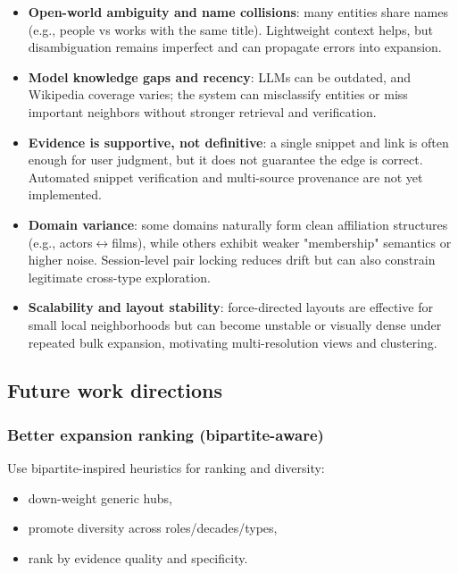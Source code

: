 \begin{itemize}[leftmargin=*]

\item \textbf{Open-world ambiguity and name collisions}: many entities share names (e.g., people vs works with the same title). Lightweight context helps, but disambiguation remains imperfect and can propagate errors into expansion.

\item \textbf{Model knowledge gaps and recency}: LLMs can be outdated, and Wikipedia coverage varies; the system can misclassify entities or miss important neighbors without stronger retrieval and verification.

\item \textbf{Evidence is supportive, not definitive}: a single snippet and link is often enough for user judgment, but it does not guarantee the edge is correct. Automated snippet verification and multi-source provenance are not yet implemented.

\item \textbf{Domain variance}: some domains naturally form clean affiliation structures (e.g., actors\(\leftrightarrow\)films), while others exhibit weaker "membership" semantics or higher noise. Session-level pair locking reduces drift but can also constrain legitimate cross-type exploration.

\item \textbf{Scalability and layout stability}: force-directed layouts are effective for small local neighborhoods but can become unstable or visually dense under repeated bulk expansion, motivating multi-resolution views and clustering.

\end{itemize}

\subsection{Future work directions}

\subsubsection{Better expansion ranking (bipartite-aware)}

Use bipartite-inspired heuristics for ranking and diversity:

\begin{itemize}[leftmargin=*]

\item down-weight generic hubs,

\item promote diversity across roles/decades/types,

\item rank by evidence quality and specificity.

\end{itemize}

